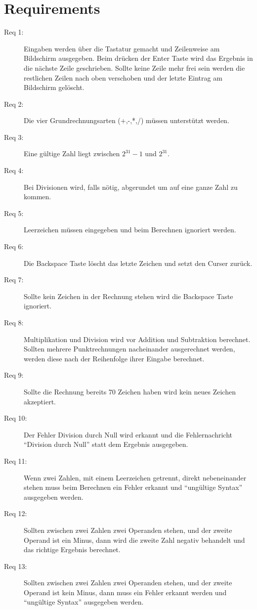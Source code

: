 \section{Requirements}

\begin{description}
\item[Req 1:] Eingaben werden über die Tastatur gemacht und Zeilenweise am Bildschirm ausgegeben. Beim drücken der Enter Taste
wird das Ergebnis in die nächste Zeile geschrieben. Sollte keine Zeile mehr frei sein werden die restlichen Zeilen nach 
oben verschoben und der letzte Eintrag am Bildschirm gelöscht.
\item[Req 2:] Die vier Grundrechnungsarten (+,-,*,/) müssen unterstützt werden.
\item[Req 3:] Eine gültige Zahl liegt zwischen $2^31 -1$ und $2^31$.
\item[Req 4:] Bei Divisionen wird, falls nötig, abgerundet um auf eine ganze Zahl zu kommen.
\item[Req 5:] Leerzeichen müssen eingegeben und beim Berechnen ignoriert werden.
\item[Req 6:] Die Backspace Taste löscht das letzte Zeichen und setzt den Curser zurück.
\item[Req 7:] Sollte kein Zeichen in der Rechnung stehen wird die Backspace Taste ignoriert.
\item[Req 8:] Multiplikation und Division wird vor Addition und Subtraktion berechnet. Sollten mehrere Punktrechnungen nacheinander 
ausgerechnet werden, werden diese nach der Reihenfolge ihrer Eingabe berechnet.
\item[Req 9:] Sollte die Rechnung bereits 70 Zeichen haben wird kein neues Zeichen akzeptiert.
\item[Req 10:] Der Fehler Division durch Null wird erkannt und die Fehlernachricht ``Division durch Null'' statt dem Ergebnis ausgegeben.
\item[Req 11:] Wenn zwei Zahlen, mit einem Leerzeichen getrennt, direkt nebeneinander stehen muss beim Berechnen ein Fehler erkannt und
``ungültige Syntax'' ausgegeben werden.
\item[Req 12:] Sollten zwischen zwei Zahlen zwei Operanden stehen, und der zweite Operand ist ein Minus, dann wird die zweite Zahl negativ behandelt 
und das richtige Ergebnis berechnet.
\item[Req 13:] Sollten zwischen zwei Zahlen zwei Operanden stehen, und der zweite Operand ist kein Minus, dann muss ein Fehler erkannt werden
und ``ungültige Syntax'' ausgegeben werden.

\end{description}
